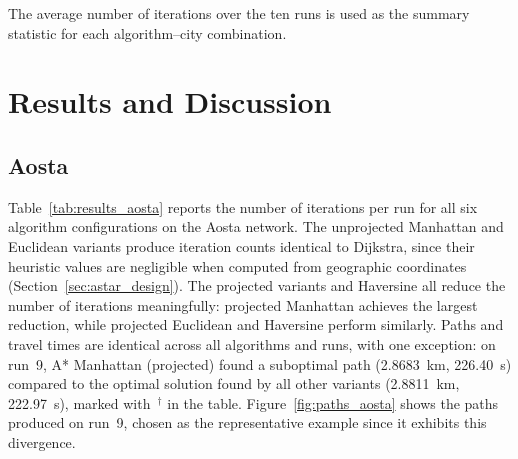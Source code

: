 \documentclass[12pt,a4paper]{article}
\begin{document}
The average number of iterations over the ten runs is used as the summary statistic for each algorithm–city combination.

\section{Results and Discussion}

\subsection{Aosta}\label{sec:results_aosta}

Table~\ref{tab:results_aosta} reports the number of iterations per run for all six algorithm configurations on the Aosta network.
The unprojected Manhattan and Euclidean variants produce iteration counts identical to Dijkstra, since their heuristic values are negligible when computed from geographic coordinates (Section~\ref{sec:astar_design}).
The projected variants and Haversine all reduce the number of iterations meaningfully: projected Manhattan achieves the largest reduction, while projected Euclidean and Haversine perform similarly.
Paths and travel times are identical across all algorithms and runs, with one exception: on run~9, A* Manhattan (projected) found a suboptimal path (2.8683~km, 226.40~s) compared to the optimal solution found by all other variants (2.8811~km, 222.97~s), marked with~$^\dagger$ in the table.
Figure~\ref{fig:paths_aosta} shows the paths produced on run~9, chosen as the representative example since it exhibits this divergence.
\end{document}
